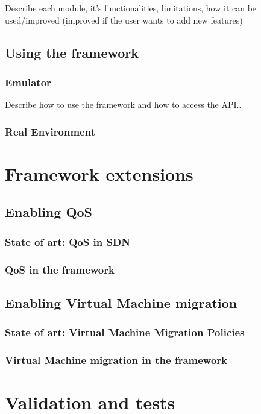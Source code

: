 \documentclass[12pt,english]{book}
\begin{document}
Describe each module, it's functionalities, limitations, how it can be used/improved (improved if the user wants to add new features)

\section{Using the framework}

\subsection{Emulator}
Describe how to use the framework and how to access the API..

\subsection{Real Environment}

\chapter{Framework extensions \label{cha:} }

\section{Enabling QoS}
\subsection{State of art: QoS in SDN}
\subsection{QoS in the framework}

\section{Enabling Virtual Machine migration}
\subsection{State of art: Virtual Machine Migration Policies}
\subsection{Virtual Machine migration in the framework}


\chapter{Validation and tests \label{cha:valtes} }
\end{document}
